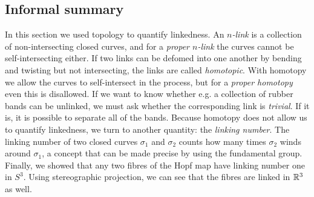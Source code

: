 \subsection*{Informal summary}
In this section we used topology to quantify linkedness.
An \emph{$n$-link} is a collection of non-intersecting closed curves,
and for a \emph{proper $n$-link} the curves cannot be self-intersecting either.
If two links can be defomed into one another by bending and twisting but not intersecting,
the links are called \emph{homotopic}.
With homotopy we allow the curves to self-intersect in the process,
but for a \emph{proper homotopy} even this is disallowed.
If we want to know whether e.g. a collection of rubber bands can be unlinked,
we must ask whether the corresponding link is \emph{trivial}.
If it is, it is possible to separate all of the bands.
Because homotopy does not allow us to quantify linkedness,
we turn to another quantity: the \emph{linking number}.
The linking number of two closed curves $\sigma_1$ and $\sigma_2$
counts how many times $\sigma_2$ winds around $\sigma_1$,
a concept that can be made precise by using the fundamental group.
Finally, we showed that any two fibres of the Hopf map have linking number one in $S^3\!$.
Using stereographic projection,
we can see that the fibres are linked in $\mathbb{R}^3$ as well.
